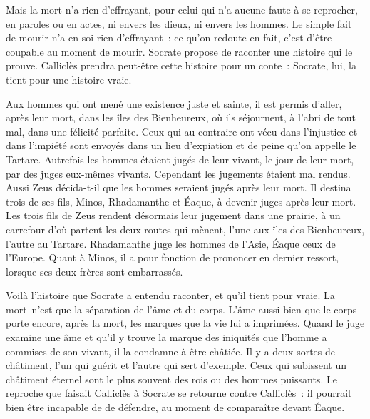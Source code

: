 \documentclass[a5paper,12pt]{article}
\begin{document}
Mais la mort n'a rien d'effrayant, pour celui qui n'a aucune faute à se reprocher, en paroles ou en actes, ni envers les dieux, ni envers les hommes. Le simple fait de mourir n'a en soi rien d'effrayant~: ce qu'on redoute en fait, c'est d'être coupable au moment de mourir. Socrate propose de raconter une histoire qui le prouve. Calliclès prendra peut-être cette histoire pour un conte~: Socrate, lui, la tient pour une histoire vraie.

Aux hommes qui ont mené une existence juste et sainte, il est permis d'aller, après leur mort, dans les îles des Bienheureux, où ils séjournent, à l'abri de tout mal, dans une félicité parfaite. Ceux qui au contraire ont vécu dans l'injustice et dans l'impiété sont envoyés dans un lieu d'expiation et de peine qu'on appelle le Tartare. Autrefois les hommes étaient jugés de leur vivant, le jour de leur mort, par des juges eux-mêmes vivants. Cependant les jugements étaient mal rendus. Aussi Zeus décida-t-il que les hommes seraient jugés après leur mort. Il destina trois de ses fils, Minos, Rhadamanthe et Éaque, à devenir juges après leur mort. Les trois fils de Zeus rendent désormais leur jugement dans une prairie, à un carrefour d'où partent les deux routes qui mènent, l'une aux îles des Bienheureux, l'autre au Tartare. Rhadamanthe juge les hommes de l'Asie, Éaque ceux de l'Europe. Quant à Minos, il a pour fonction de prononcer en dernier ressort, lorsque ses deux frères sont embarrassés.

Voilà l'histoire que Socrate a entendu raconter, et qu'il tient pour vraie. La mort~n'est que la séparation de l'âme et du corps. L'âme aussi bien que le corps porte encore, après la mort, les marques que la vie lui a imprimées. Quand le juge examine une âme et qu'il y trouve la marque des iniquités que l'homme a commises de son vivant, il la condamne à être châtiée. Il y a deux sortes de châtiment, l'un qui guérit et l'autre qui sert d'exemple. Ceux qui subissent un châtiment éternel sont le plus souvent des rois ou des hommes puissants. Le reproche que faisait Calliclès à Socrate se retourne contre Calliclès~: il pourrait bien être incapable de de défendre, au moment de comparaître devant Éaque.
\end{document}
